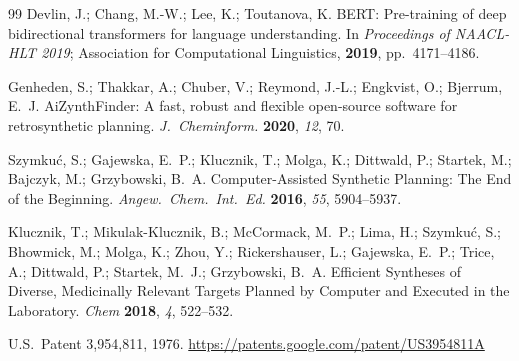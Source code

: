 \documentclass[12pt]{article}
\begin{document}
\begin{thebibliography}{99}
  Devlin, J.; Chang, M.-W.; Lee, K.; Toutanova, K.
  BERT: Pre-training of deep bidirectional transformers for language
  understanding.
  In \emph{Proceedings of NAACL-HLT 2019};
  Association for Computational Linguistics, \textbf{2019}, pp.\ 4171--4186.

  Genheden, S.; Thakkar, A.; Chuber, V.; Reymond, J.-L.; Engkvist, O.;
  Bjerrum, E.~J.
  AiZynthFinder: A fast, robust and flexible open-source software for
  retrosynthetic planning.
  \emph{J.\ Cheminform.} \textbf{2020}, \emph{12}, 70.

  Szymku\'c, S.; Gajewska, E.~P.; Klucznik, T.; Molga, K.; Dittwald, P.;
  Startek, M.; Bajczyk, M.; Grzybowski, B.~A.
  Computer-Assisted Synthetic Planning: The End of the Beginning.
  \emph{Angew.\ Chem.\ Int.\ Ed.} \textbf{2016}, \emph{55}, 5904--5937.

  Klucznik, T.; Mikulak-Klucznik, B.; McCormack, M.~P.; Lima, H.;
  Szymku\'c, S.; Bhowmick, M.; Molga, K.; Zhou, Y.; Rickershauser, L.;
  Gajewska, E.~P.; Trice, A.; Dittwald, P.; Startek, M.~J.; Grzybowski, B.~A.
  Efficient Syntheses of Diverse, Medicinally Relevant Targets Planned by
  Computer and Executed in the Laboratory.
  \emph{Chem} \textbf{2018}, \emph{4}, 522--532.

  U.S.\ Patent 3,954,811, 1976.
  \url{https://patents.google.com/patent/US3954811A}

\end{thebibliography}
\end{document}
